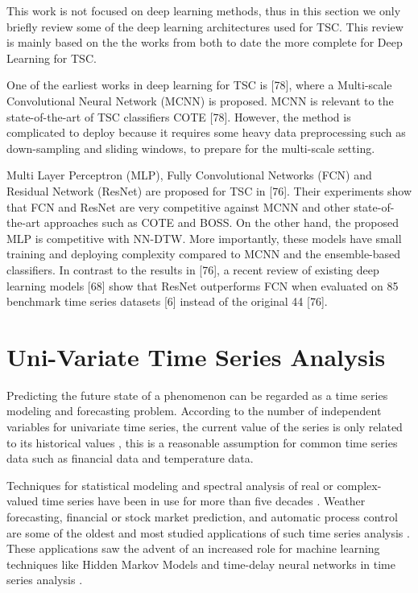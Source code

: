 This work is not focused on deep learning methods, thus in this section we only briefly review some of the deep learning architectures used for TSC. This review is mainly based on the the works from \cite{Bagnall2017a, Fawaz2019} both to date the more complete for Deep Learning for TSC.

One of the earliest works in deep learning for TSC is [78], where a Multi-scale Convolutional Neural Network (MCNN) is proposed. MCNN is relevant to the state-of-the-art of TSC classifiers COTE [78]. However, the method is complicated to deploy because it requires some heavy data preprocessing such as down-sampling and sliding windows, to prepare for the multi-scale setting.

Multi Layer Perceptron (MLP), Fully Convolutional Networks (FCN) and Residual Network (ResNet) are proposed for TSC in [76]. Their experiments show that FCN and ResNet are very competitive against MCNN and other state-of-the-art approaches such as COTE and BOSS. On the other hand, the proposed MLP is competitive with NN-DTW. More importantly, these models have small training and deploying complexity compared to MCNN and the ensemble-based classifiers. In contrast to the results in [76], a recent review of existing deep learning models [68] show that ResNet outperforms FCN when evaluated on 85 benchmark time series datasets [6] instead of the original 44 [76].


\section{Uni-Variate Time Series Analysis}
\label{Sec:TSAnalysis}
Predicting the future state of a phenomenon can be regarded as a time series modeling and forecasting problem. According to the number of independent variables for univariate time series, the current value of the series is only related to its historical values \cite{Hyndman2006}, this is a reasonable assumption for common time series data such as financial data and temperature data.

Techniques for statistical modeling and spectral analysis of real or complex-valued time series have been in use for more than five decades \cite{Hyndman2006, Chatfield2019}. Weather forecasting, financial or stock market prediction, and automatic process control are some of the oldest and most studied applications of such time series analysis \cite{Box1976}. These applications saw the advent of an increased role for machine learning techniques like Hidden Markov Models and time-delay neural networks in time series analysis \cite{}.

